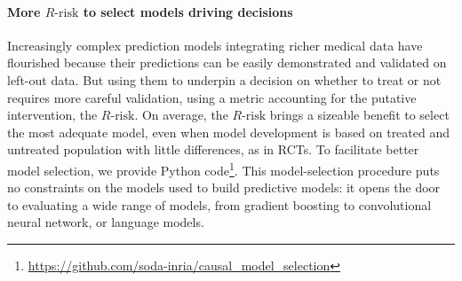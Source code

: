 \documentclass[a4paper,num-refs]{oup-contemporary}%
\begin{document}

\paragraph{More $R\text{-risk}$ to select models driving decisions}

Increasingly complex prediction models integrating richer medical data
have flourished because their predictions can be easily
demonstrated and validated on left-out data. But using them to underpin a
decision on whether to treat or not requires more careful validation,
using a metric accounting for the
putative intervention, the $R\text{-risk}$. On average, the $R\text{-risk}$
brings a sizeable benefit to select the most adequate model, even when
model development is based on treated and
untreated population with little differences, as in RCTs. To facilitate better model selection, we provide Python
code\footnote{\url{https://github.com/soda-inria/causal_model_selection}}.
This model-selection procedure puts no constraints on the models used to
build predictive models: it opens the door to evaluating a wide range of
models, from gradient boosting to convolutional neural network, or language
models.
\end{document}
